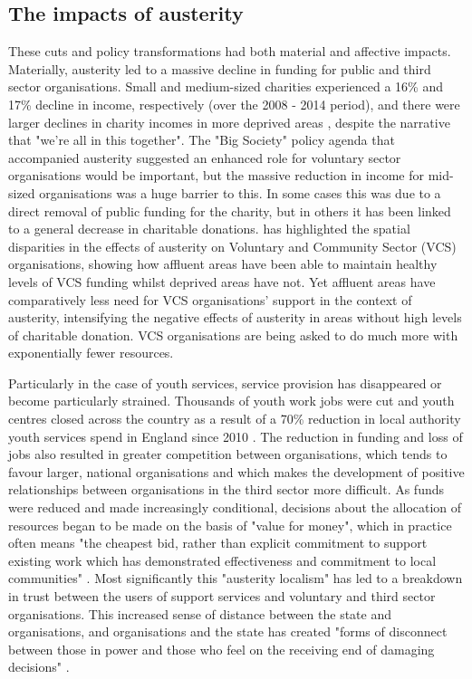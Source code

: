 \subsection{The impacts of austerity}
\label{subsec:the-impacts-of-austerity}

These cuts and policy transformations had both material and affective impacts. Materially, austerity led to a massive decline in funding for public and third sector organisations. Small and medium-sized charities experienced a 16\% and 17\% decline in income, respectively (over the 2008 - 2014 period), and there were larger declines in charity incomes in more deprived areas \citep{clifford_charitable_2017}, despite the narrative that "we're all in this together". The "Big Society" policy agenda that accompanied austerity suggested an enhanced role for voluntary sector organisations would be important, but the massive reduction in income for mid-sized organisations was a huge barrier to this. In some cases this was due to a direct removal of public funding for the charity, but in others it has been linked to a general decrease in charitable donations. \citet{jones_uneven_2016} has highlighted the spatial disparities in the effects of austerity on Voluntary and Community Sector (VCS) organisations, showing how affluent areas have been able to maintain healthy levels of VCS funding whilst deprived areas have not. Yet affluent areas have comparatively less need for VCS organisations' support in the context of austerity, intensifying the negative effects of austerity in areas without high levels of charitable donation. VCS organisations are being asked to do much more with exponentially fewer resources.

Particularly in the case of youth services, service provision has disappeared or become particularly strained. Thousands of youth work jobs were cut and youth centres closed across the country as a result of a 70\% reduction in local authority youth services spend in England since 2010 \citep[9]{ymca_making_2020}. The reduction in funding and loss of jobs also resulted in greater competition between organisations, which tends to favour larger, national organisations and which makes the development of positive relationships between organisations in the third sector more difficult. As funds were reduced and made increasingly conditional, decisions about the allocation of resources began to be made on the basis of "value for money", which in practice often means "the cheapest bid, rather than explicit commitment to support existing work which has demonstrated effectiveness and commitment to local communities" \citep[732]{clayton_distancing_2016}. Most significantly this "austerity localism" has led to a breakdown in trust between the users of support services and voluntary and third sector organisations. This increased sense of distance between the state and organisations, and organisations and the state has created "forms of disconnect between those in power and those who feel on the receiving end of damaging decisions" \citep[737]{clayton_distancing_2016}.

